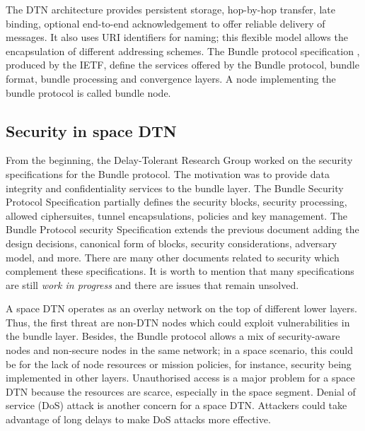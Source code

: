 The DTN architecture provides persistent storage, hop-by-hop transfer, late binding, optional end-to-end acknowledgement to offer reliable delivery of messages. It also uses URI identifiers for naming; this flexible model allows the encapsulation of different addressing schemes. The Bundle protocol specification \cite{rfc5050}, produced by the IETF,  define the services offered by the Bundle protocol, bundle format, bundle processing and convergence layers. A node implementing the bundle protocol is called bundle node. 

 




\subsection{Security in space DTN}


 From the beginning, the Delay-Tolerant Research Group worked on the security specifications for the Bundle protocol. The motivation was to provide data integrity and confidentiality services to the bundle layer. The Bundle Security Protocol Specification \cite{rfc6257} partially defines the security blocks, security processing, allowed ciphersuites, tunnel encapsulations, policies and key management. The Bundle Protocol security Specification \cite{ietf-dtn-bpsec-07} extends the previous document adding the design decisions, canonical form of blocks, security considerations, adversary model, and more.  There are many other documents related to security which complement these specifications.  It is worth to mention that many specifications are still \textit{work in progress} and there are issues that remain unsolved.
 
 A space DTN operates as an overlay network on the top of different lower layers. Thus, the first threat are non-DTN nodes which could exploit vulnerabilities in the bundle layer. Besides, the Bundle protocol allows a mix of security-aware nodes and non-secure nodes in the same network; in a space scenario, this could be for the lack of node resources or mission policies, for instance, security being implemented in other layers. Unauthorised access is a major problem for a space DTN because the resources are scarce, especially in the space segment. Denial of service (DoS) attack is another concern for a space DTN. Attackers could take advantage of long delays to make DoS attacks more effective. 
 
 
 
 




